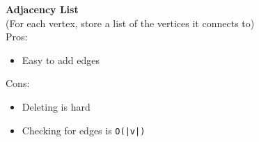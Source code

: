 \documentclass[english, 10pt]{article}
\begin{document}
\begin{myproof}
\textbf{Adjacency List}\\
(For each vertex, store a list of the vertices it connects to)\\

Pros:
\begin{itemize}
	\item Easy to add edges
\end{itemize}

Cons:
\begin{itemize}
	\item Deleting is hard
	\item Checking for edges is \texttt{O(|v|)}
\end{itemize}

{
\centering




\begin{tikzpicture}[x=0.75pt,y=0.75pt,yscale=-1,xscale=1]


\end{tikzpicture}}
\end{myproof}
\end{document}

